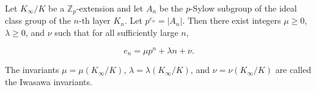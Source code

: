 Let $K_{\infty}/K$ be a $\mathbb{Z}_p$-extension and let $A_n$ be the $p$-Sylow subgroup of the ideal class group of the $n$-th layer $K_n$. Let $p^{e_n} = |A_n|$. Then there exist integers $\mu \geq 0$, $\lambda \geq 0$, and $\nu$ such that for all sufficiently large $n$,

$$e_n = \mu p^n + \lambda n + \nu.$$

The invariants $\mu = \mu(K_{\infty}/K)$, $\lambda = \lambda(K_{\infty}/K)$, and $\nu = \nu(K_{\infty}/K)$ are called the Iwasawa invariants.
